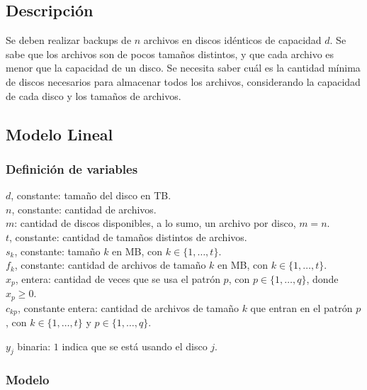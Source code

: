 \documentclass[11pt, a4paper, pdftex]{article}
\begin{document}
\subsection{Descripción}

Se deben realizar backups de $n$ archivos en discos idénticos de
capacidad $d$. Se sabe que los archivos son de pocos tamaños distintos,
y que cada archivo es menor que la capacidad de un disco. Se necesita
saber cuál es la cantidad mínima de discos necesarios para almacenar
todos los archivos, considerando la capacidad de cada disco y los
tamaños de archivos.

\subsection{Modelo Lineal}

\subsubsection{Definición de variables}

\noindent $d$, constante: tamaño del disco en TB. \\

\noindent $n$, constante: cantidad de archivos. \\

\noindent $m$: cantidad de discos disponibles, a lo sumo, un archivo por disco, $m = n$. \\

\noindent $t$, constante: cantidad de tamaños distintos de archivos. \\

\noindent $s_{k}$, constante: tamaño $k$ en MB, con $k \in \{1, \ldots, t\}$. \\

\noindent $f_{k}$, constante: cantidad de archivos de tamaño $k$ en MB, con $k \in \{1, \ldots, t\}$. \\

\noindent $x_{p}$, entera: cantidad de veces que se usa el patrón $p$, con $p \in \{1, \ldots, q\}$, donde $x_{p} \ge 0$. \\

\noindent $c_{kp}$, constante entera: cantidad de archivos de tamaño $k$ que entran en el patrón $p$, con $k \in \{1, \ldots, t\}$ y $p \in \{1, \ldots, q\}$.

\noindent $y_{j}$ binaria: $1$ indica que se está usando el disco $j$.

\subsubsection{Modelo}
\end{document}
